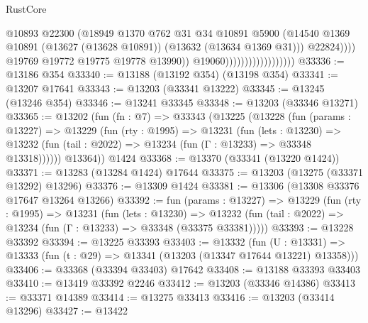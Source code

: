 \begin{lexlean}{RustCore}
\begin{coremodule}
                                                  @10893
                                                  @22300
                                                  (@18949
                                                    @1370
                                                    @762
                                                    @31
                                                    @34
                                                    @10891
                                                    @5900
                                                    (@14540
                                                      @1369
                                                      @10891
                                                      (@13627 (@13628 @10891))
                                                      (@13632 (@13634 @1369 @31)))
                                                    @22824))))
                                            @19769
                                            @19772
                                            @19775
                                            @19778
                                            @13990))
                                        @19060))))))))))))))))))
@33336 := @13186 @354
@33340 := @13188 (@13192 @354) (@13198 @354)
@33341 := @13207 @17641
@33343 := @13203 (@33341 @13222)
@33345 := @13245 (@13246 @354)
@33346 := @13241 @33345
@33348 := @13203 (@33346 @13271)
@33365 := @13202
    (fun (fn : @7) =>
    @33343
      (@13225
        (@13228
          (fun (params : @13227) =>
          @13229
            (fun (rty : @1995) =>
            @13231
              (fun (lets : @13230) =>
              @13232 (fun (tail : @2022) => @13234 (fun (Γ : @13233) => @33348 @13318))))))
        @13364))
    @1424
@33368 := @13370 (@33341 (@13220 @1424))
@33371 := @13283 (@13284 @1424) @17644
@33375 := @13203 (@13275 (@33371 @13292) @13296)
@33376 := @13309 @1424
@33381 := @13306 (@13308 @33376 @17647 @13264 @13266)
@33392 := fun (params : @13227) =>
  @13229
    (fun (rty : @1995) =>
    @13231
      (fun (lets : @13230) =>
      @13232 (fun (tail : @2022) => @13234 (fun (Γ : @13233) => @33348 (@33375 @33381)))))
@33393 := @13228 @33392
@33394 := @13225 @33393
@33403 := @13332
    (fun (U : @13331) => @13333 (fun (t : @29) => @13341 (@13203 (@13347 @17644 @13221) @13358)))
@33406 := @33368 (@33394 @33403) @17642
@33408 := @13188 @33393 @33403
@33410 := @13419 @33392 @2246
@33412 := @13203 (@33346 @14386)
@33413 := @33371 @14389
@33414 := @13275 @33413
@33416 := @13203 (@33414 @13296)
@33427 := @13422

\end{coremodule}
\end{lexlean}
